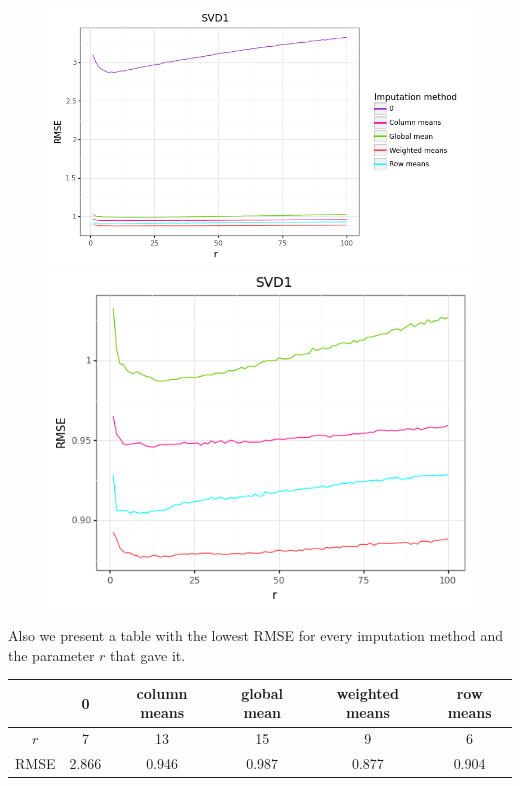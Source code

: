 \documentclass[11pt]{amsart}
\begin{document}
\begin{figure}[H]
\centering
\begin{minipage}{.5\textwidth}
  \centering
  \includegraphics[scale=0.43]{svd1_1}
\end{minipage}%
\begin{minipage}{.5\textwidth}
  \centering
  \includegraphics[scale=0.43]{svd1_2}
\end{minipage}
\end{figure}

Also we present a table with the lowest RMSE for every imputation method and the parameter $r$ that gave it.
\begin{table}[H]
\begin{tabular}{c|ccccc}
& 0 & column means & global mean & weighted means & row means \\
\hline
$r$ & 7 & 13 & 15 & 9 & 6 \\
RMSE & 2.866 & 0.946 & 0.987 & 0.877 & 0.904 \\
\end{tabular}
\end{table}
\end{document}
